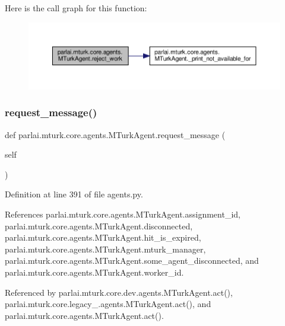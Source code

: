 Here is the call graph for this function\+:
\nopagebreak
\begin{figure}[H]
\begin{center}
\leavevmode
\includegraphics[width=350pt]{classparlai_1_1mturk_1_1core_1_1agents_1_1MTurkAgent_a88473ff128e7a40c59711d35eab97a0b_cgraph}
\end{center}
\end{figure}
\mbox{\label{classparlai_1_1mturk_1_1core_1_1agents_1_1MTurkAgent_ade43480595cc2f6be96b5eb690e3128d}} 
\subsubsection{\texorpdfstring{request\+\_\+message()}{request\_message()}}
{\footnotesize\ttfamily def parlai.\+mturk.\+core.\+agents.\+M\+Turk\+Agent.\+request\+\_\+message (\begin{DoxyParamCaption}\item[{}]{self }\end{DoxyParamCaption})}



Definition at line 391 of file agents.\+py.



References parlai.\+mturk.\+core.\+agents.\+M\+Turk\+Agent.\+assignment\+\_\+id, parlai.\+mturk.\+core.\+agents.\+M\+Turk\+Agent.\+disconnected, parlai.\+mturk.\+core.\+agents.\+M\+Turk\+Agent.\+hit\+\_\+is\+\_\+expired, parlai.\+mturk.\+core.\+agents.\+M\+Turk\+Agent.\+mturk\+\_\+manager, parlai.\+mturk.\+core.\+agents.\+M\+Turk\+Agent.\+some\+\_\+agent\+\_\+disconnected, and parlai.\+mturk.\+core.\+agents.\+M\+Turk\+Agent.\+worker\+\_\+id.



Referenced by parlai.\+mturk.\+core.\+dev.\+agents.\+M\+Turk\+Agent.\+act(), parlai.\+mturk.\+core.\+legacy\+\_.\+agents.\+M\+Turk\+Agent.\+act(), and parlai.\+mturk.\+core.\+agents.\+M\+Turk\+Agent.\+act().

